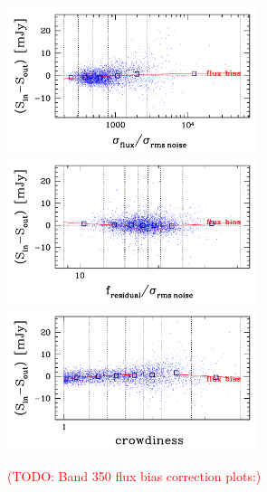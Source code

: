 \documentclass[11pt,a4paper]{article}
\begin{document}
\begin{figure}[H]
	\caption{
		\textcolor{red}{(TODO: Band 350 flux bias correction plots:)}
	}
	\includegraphics[width=0.65\textwidth]{galsim_350_fbias_1}
	\includegraphics[width=0.65\textwidth]{galsim_350_fbias_2}
	\includegraphics[width=0.65\textwidth]{galsim_350_fbias_3}
\end{figure}
\end{document}
